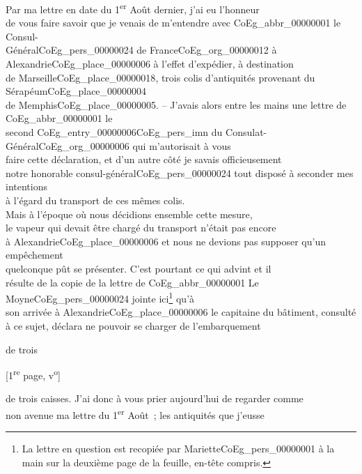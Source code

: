 \documentclass{book}
\begin{document}
\indent Par ma lettre en date du 1\textsuperscript{er} Août dernier, j’ai eu l’honneur\\
de vous faire savoir que je venais de m’entendre avec \gls{CoEg_abbr_00000001} le Consul-\\
Général\gls{CoEg_pers_00000024} de France\gls{CoEg_org_00000012} à Alexandrie\gls{CoEg_place_00000006} à l’effet d’expédier, à destination\\
de Marseille\gls{CoEg_place_00000018}, trois colis d’antiquités provenant du Sérapéum\gls{CoEg_place_00000004}\\
de Memphis\gls{CoEg_place_00000005}. – J’avais alors entre les mains une lettre de \gls{CoEg_abbr_00000001} le\\
second \gls{CoEg_entry_00000006}\gls{CoEg_pers_imn} du Consulat-Général\gls{CoEg_org_00000006} qui m’autorisait à vous\\
faire cette déclaration, et d’un autre côté je savais officieusement\\
notre honorable consul-général\gls{CoEg_pers_00000024} tout disposé à seconder mes intentions\\
à l’égard du transport de ces mêmes colis.\\
\indent Mais à l’époque où nous décidions ensemble cette mesure,\\
le vapeur qui devait être chargé du transport n’était pas encore\\
à Alexandrie\gls{CoEg_place_00000006} et nous ne devions pas supposer qu’un empêchement\\
quelconque pût se présenter. C’est pourtant ce qui advint et il\\
résulte de la copie de la lettre de \gls{CoEg_abbr_00000001} Le Moyne\gls{CoEg_pers_00000024} jointe ici\footnote{La lettre en question est recopiée par Mariette\gls{CoEg_pers_00000001} à la main sur la deuxième page de la feuille, en-tête compris.} qu’à\\
son arrivée à Alexandrie\gls{CoEg_place_00000006} le capitaine du bâtiment, consulté\\
à ce sujet, déclara ne pouvoir se charger de l’embarquement
\begin{flushright}de trois\end{flushright}
{\footnotesize \begin{center} {[1\textsuperscript{re} page, v\textsuperscript{o}]}\end{center}}
de trois caisses. J’ai donc à vous prier aujourd’hui de regarder comme\\
non avenue ma lettre du 1\textsuperscript{er} Août~; les antiquités que j’eusse\\
\end{document}
